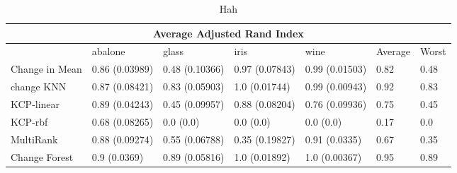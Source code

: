 
\begin{table}[!ht]
\centering
{
\begin{tabular}{ |p{2cm}|p{1.5cm}|p{1.5cm}|p{1.5cm}|p{1.5cm}|p{1.5cm}|p{1.5cm}|}
\hline
\multicolumn{7}{|c|}{Average Adjusted Rand Index} \\
\hline

\hline
 & abalone & glass & iris & wine & Average & Worst  \\
\hline
\hline
Change in Mean & 0.86 (0.03989) & 0.48 (0.10366) & 0.97 (0.07843) & 0.99 (0.01503)& 0.82 & 0.48 \\
change KNN & 0.87 (0.08421) & 0.83 (0.05903) & 1.0 (0.01744) & 0.99 (0.00943)& 0.92 & 0.83 \\
KCP-linear & 0.89 (0.04243) & 0.45 (0.09957) & 0.88 (0.08204) & 0.76 (0.09936)& 0.75 & 0.45 \\
KCP-rbf & 0.68 (0.08265) & 0.0 (0.0) & 0.0 (0.0) & 0.0 (0.0)& 0.17 & 0.0 \\
MultiRank & 0.88 (0.09274) & 0.55 (0.06788) & 0.35 (0.19827) & 0.91 (0.0335)& 0.67 & 0.35 \\
Change Forest & 0.9 (0.0369) & 0.89 (0.05816) & 1.0 (0.01892) & 1.0 (0.00367)& 0.95 & 0.89 \\
\hline
\end{tabular}}
\\
\caption{Hah}
\vspace{10pt}
\label{tab:yourlabel}
\end{table}